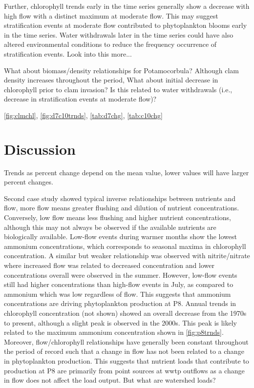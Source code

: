 \documentclass[letterpaper,12pt,oneside]{article}\usepackage[]{graphicx}\usepackage[]{color}
\begin{document}
Further, chlorophyll trends early in the time series generally show a decrease with high flow with a distinct maximum at moderate flow.  This may suggest stratification events at moderate flow contributed to phytoplankton blooms early in the time series. Water withdrawals later in the time series could have also altered environmental conditions to reduce the frequency occurrence of stratification events.  Look into this more...

What about biomass/density relationships for Potamocorbula?  Although clam density increases throughout the period,  What about initial decrease in chlorophyll prior to clam invasion?  Is this related to water withdrawals (i.e., decrease in stratification events at moderate flow)?

\cref{fig:clmchl}, \cref{fig:d7c10trnds}, \cref{tab:d7chg}, \cref{tab:c10chg}

\section{Discussion}

Trends as percent change depend on the mean value, lower values will have larger percent changes.

Second case study showed typical inverse relationships between nutrients and flow, more flow means greater flushing and dilution of nutrient concentrations.  Conversely, low flow means less flushing and higher nutrient concentrations, although this may not always be observed if the available nutrients are biologically available.  Low-flow events during warmer months show the lowest ammonium concentrations, which corresponds to seasonal maxima in chlorophyll concentration.  A similar but weaker relationship was observed with nitrite/nitrate where increased flow was related to decreased concentration and lower concentrations overall were observed in the summer.  However, low-flow events still had higher concentrations than high-flow events in July, as compared to ammonium which was low regardless of flow.  This suggests that ammonium concentrations are driving phytoplankton production at P8.  Annual trends in chlorophyll concentration (not shown) showed an overall decrease from the 1970s to present, although a slight peak is observed in the 2000s.  This peak is likely related to the maximum ammonium concentration shown in \cref{fig:p8trnds}.  Moreover, flow/chlorophyll relationships have generally been constant throughout the period of record such that a change in flow has not been related to a change in phytoplankton production.  This suggests that nutrient loads that contribute to production at P8 are primarily from point sources at \ac{wwtp} outflows as a change in flow does not affect the load output.  But what are watershed loads?  
\end{document}
